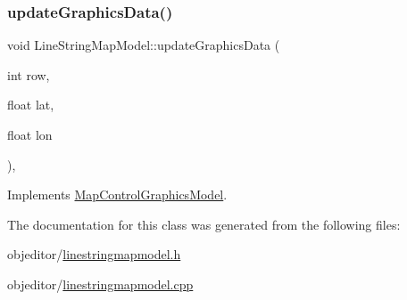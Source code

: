 \mbox{\label{class_line_string_map_model_acdc4df56b2414a10f00f2f01b8418ea0}} 
\subsubsection{\texorpdfstring{updateGraphicsData()}{updateGraphicsData()}}
{\footnotesize\ttfamily void Line\+String\+Map\+Model\+::update\+Graphics\+Data (\begin{DoxyParamCaption}\item[{int}]{row,  }\item[{float}]{lat,  }\item[{float}]{lon }\end{DoxyParamCaption})\hspace{0.3cm}{\ttfamily [override]}, {\ttfamily [virtual]}}



Implements \mbox{\hyperlink{class_map_control_graphics_model_ae5a590579987d471211cf59c61b1b54c}{Map\+Control\+Graphics\+Model}}.



The documentation for this class was generated from the following files\+:\begin{DoxyCompactItemize}
\item 
objeditor/\mbox{\hyperlink{linestringmapmodel_8h}{linestringmapmodel.\+h}}\item 
objeditor/\mbox{\hyperlink{linestringmapmodel_8cpp}{linestringmapmodel.\+cpp}}\end{DoxyCompactItemize}
